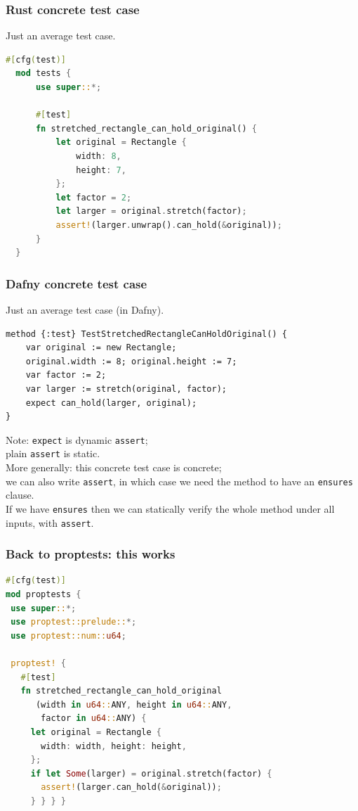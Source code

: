 \documentclass{beamer}
\newenvironment{changemargin}[1]{%
  \begin{list}{}{%
    \setlength{\topsep}{0pt}%
    \setlength{\leftmargin}{#1}%
    \setlength{\rightmargin}{1em}
    \setlength{\listparindent}{\parindent}%
    \setlength{\itemindent}{\parindent}%
    \setlength{\parsep}{\parskip}%
  }%
  \item[]}{\end{list}}
\begin{document}
\begin{frame}[fragile]
  \frametitle{Rust concrete test case}
  \begin{changemargin}{1cm}
    Just an average test case.
  \end{changemargin}
  \small
\begin{lstlisting}[language=Rust]
  #[cfg(test)]
  mod tests {
      use super::*;

      #[test]
      fn stretched_rectangle_can_hold_original() {
          let original = Rectangle {
              width: 8,
              height: 7,
          };
          let factor = 2;
          let larger = original.stretch(factor);
          assert!(larger.unwrap().can_hold(&original));
      }
  }
\end{lstlisting}
\end{frame}

\begin{frame}[fragile]
  \frametitle{Dafny concrete test case}
  \begin{changemargin}{1cm}
    Just an average test case (in Dafny).
  \end{changemargin}
  \small
\begin{lstlisting}[language=dafny]
method {:test} TestStretchedRectangleCanHoldOriginal() {
    var original := new Rectangle;
    original.width := 8; original.height := 7;
    var factor := 2;
    var larger := stretch(original, factor);
    expect can_hold(larger, original);
}
\end{lstlisting}
\large
  \begin{changemargin}{1cm}
    Note: \texttt{expect} is dynamic \texttt{assert};\\ plain \texttt{assert} is static.\\[1em]
    More generally: this concrete test case is concrete; \\
    we can also write \texttt{assert}, in which case
    we need the method to have an \texttt{ensures} clause.\\[1em]
    If we have \texttt{ensures} then we can statically verify the whole method under all inputs, with \texttt{assert}.
  \end{changemargin}
\end{frame}

\begin{frame}[fragile]
  \frametitle{Back to proptests: this works}
\begin{lstlisting}[language=Rust]
#[cfg(test)]
mod proptests {
 use super::*;
 use proptest::prelude::*;
 use proptest::num::u64;

 proptest! {
   #[test]
   fn stretched_rectangle_can_hold_original
      (width in u64::ANY, height in u64::ANY,
       factor in u64::ANY) {
     let original = Rectangle {
       width: width, height: height,
     };
     if let Some(larger) = original.stretch(factor) {
       assert!(larger.can_hold(&original));
     } } } }
\end{lstlisting}
\end{frame}
\end{document}
